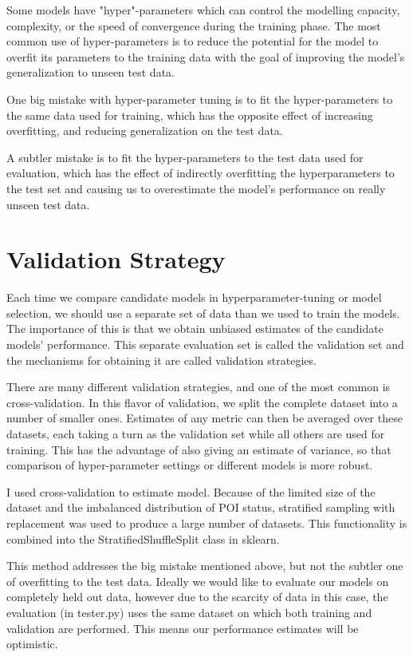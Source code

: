 \documentclass{article}
\begin{document}
Some models have "hyper"-parameters which can control the modelling capacity, complexity, or the speed of convergence during the training phase. The most common use of hyper-parameters is to reduce the potential for the model to overfit its parameters to the training data with the goal of improving the model's generalization to unseen test data.

One big mistake with hyper-parameter tuning is to fit the hyper-parameters to the same data used for training, which has the opposite effect of increasing overfitting, and reducing generalization on the test data. 

A subtler mistake is to fit the hyper-parameters to the test data used for evaluation, which has the effect of indirectly overfitting the hyperparameters to the test set and causing us to overestimate the model's performance on really unseen test data.

\section{Validation Strategy}

Each time we compare candidate models in hyperparameter-tuning or model selection, we should use a separate set of data than we used to train the models. The importance of this is that we obtain unbiased estimates of the candidate models' performance. This separate evaluation set is called the validation set and the mechanisms for obtaining it are called validation strategies. 

There are many different validation strategies, and one of the most common is cross-validation. In this flavor of validation, we split the complete dataset into a number of smaller ones. Estimates of any metric can then be averaged over these datasets, each taking a turn as the validation set while all others are used for training. This has the advantage of also giving an estimate of variance, so that comparison of hyper-parameter settings or different models is more robust.

I used cross-validation to estimate model. Because of the limited size of the dataset and the imbalanced distribution of POI status, stratified sampling with replacement was used to produce a large number of datasets. This functionality is combined into the StratifiedShuffleSplit class in sklearn.

This method addresses the big mistake mentioned above, but not the subtler one of overfitting to the test data. Ideally we would like to evaluate our models on completely held out data, however due to the scarcity of data in this case, the evaluation (in tester.py) uses the same dataset on which both training and validation are performed. This means our performance estimates will be optimistic.
\end{document}
